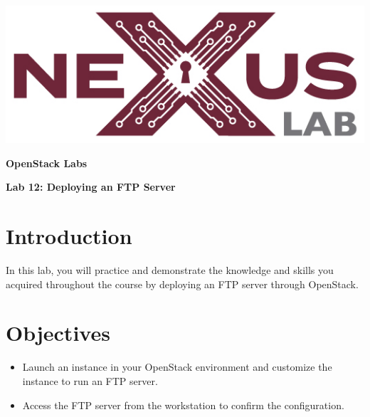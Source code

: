\documentclass[letterpaper, 12pt]{article}
\begin{document}
\begin{titlepage}
    \centering
    \includegraphics[scale=0.5]{images/nexus_lab_logo.png}

    \vspace*{\baselineskip}

    \textbf{\Large OpenStack Labs}

    \vspace*{\baselineskip}

    \textbf{\Large Lab 12: Deploying an FTP Server}
    \vspace*{\fill}
\end{titlepage}

{
    \fancyhf{}
    \fancyfoot[R]{\footnotesize\thepage}
    \renewcommand{\headrulewidth}{0pt}
}

\pagestyle{fancy}
\tableofcontents
\clearpage

\section*{Introduction}
\label{sec:introduction}
In this lab, you will practice and demonstrate the knowledge and skills you acquired throughout the course by deploying
an FTP server through OpenStack.

\section*{Objectives}
\label{sec:objectives}
\begin{itemize}[itemsep=0pt]
    \item Launch an instance in your OpenStack environment and customize the instance to run an FTP server.
    \item Access the FTP server from the workstation to confirm the configuration.
\end{itemize}
\clearpage
\end{document}
